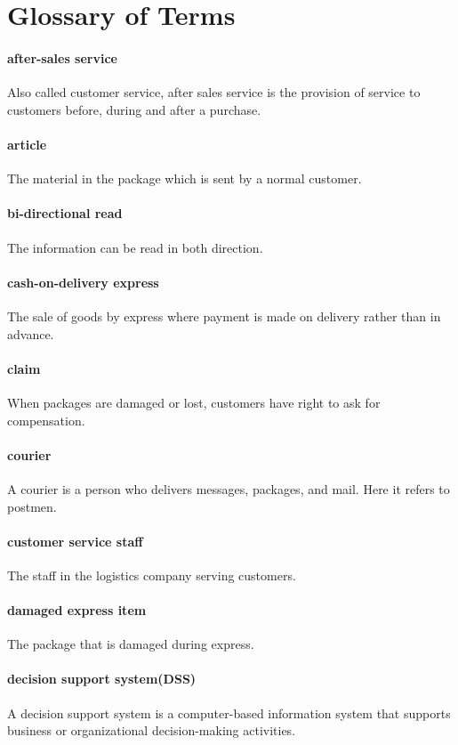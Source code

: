 \documentclass[12pt]{scrreprt}
\begin{document}
\chapter{Glossary of Terms}
\begin{spacing}{0.7}
\subsubsection{after-sales service}
Also called customer service, after sales service is the provision of service to customers before, during and after a purchase.
\subsubsection{article}
The material in the package which is sent by a normal customer.
\subsubsection{bi-directional read}
The information can be read in both direction.
\subsubsection{cash-on-delivery express}
The sale of goods by express where payment is made on delivery rather than in advance.
\subsubsection{claim}
When packages are damaged or lost, customers have right to ask for compensation.
\subsubsection{courier}
A courier is a person who delivers messages, packages, and mail. Here it refers to postmen.
\subsubsection{customer service staff}
The staff in the logistics company serving customers.
\subsubsection{damaged express item}
The package that is damaged during express.
\subsubsection{decision support system(DSS)}
A decision support system is a computer-based information system that supports business or organizational decision-making activities.

\end{spacing}
\end{document}
